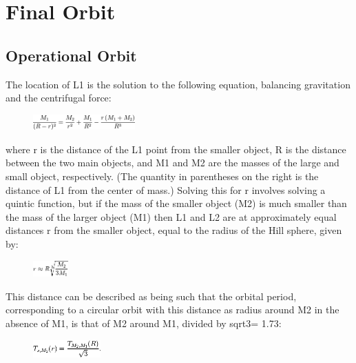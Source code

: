 \documentclass[11pt,fleqn]{book} %
\begin{document}
\chapter{Final Orbit}
\section{Operational Orbit}
The location of L1 is the solution to the following equation, balancing gravitation and the centrifugal force:

\begin{figure}[h]
	\centering
    \includegraphics[width=0.35\textwidth]{Formula1.png}
\end{figure}

where r is the distance of the L1 point from the smaller object, R is the distance between the two main objects, and M1 and M2 are the masses of the large and small object, respectively. (The quantity in parentheses on the right is the distance of L1 from the center of mass.) Solving this for r involves solving a quintic function, but if the mass of the smaller object (M2) is much smaller than the mass of the larger object (M1) then L1 and L2 are at approximately equal distances r from the smaller object, equal to the radius of the Hill sphere, given by:

\begin{figure}[h]
	\centering
    \includegraphics[width=0.12\textwidth]{Formula2.png}
\end{figure}
This distance can be described as being such that the orbital period, corresponding to a circular orbit with this distance as radius around M2 in the absence of M1, is that of M2 around M1, divided by sqrt{3}= 1.73:

\begin{figure}[h]
	\centering
    \includegraphics[width=0.23\textwidth]{Formula3.png}
\end{figure}
\clearpage
\end{document}
